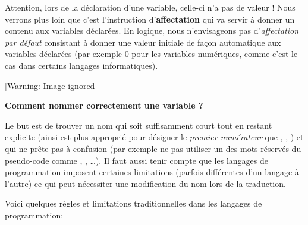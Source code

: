{
Attention, lors de la déclaration d’une variable, celle-ci n’a pas de
valeur ! Nous verrons plus loin que c’est l’instruction
d’\textbf{affectation} qui va servir à donner un contenu aux variables
déclarées. En logique, nous n’envisageons pas d’\textit{affectation par
défaut} consistant à donner une valeur initiale de façon automatique
aux variables déclarées (par exemple 0 pour les variables numériques,
comme c’est le cas dans certains langages informatiques).}

\begin{center}
 [Warning: Image ignored] %

\end{center}
{\sffamily\bfseries
Comment nommer correctement une variable ?}

{
Le but est de trouver un nom qui soit suffisamment court tout en restant
explicite (ainsi  est plus approprié pour
désigner le \textit{premier numérateur }que ,
, ) et qui ne prête pas à confusion (par exemple ne pas
utiliser un des mots réservés du pseudo-code comme
, ,
…). Il faut aussi tenir compte que les
langages de programmation imposent certaines limitations (parfois
différentes d'un langage à l'autre)
ce qui peut nécessiter une modification du nom lors de la traduction.}

{
Voici quelques règles et limitations traditionnelles dans les langages
de programmation: }

